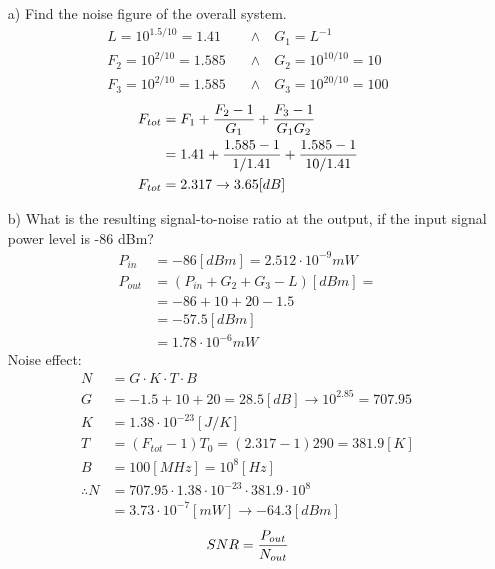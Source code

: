 \documentclass[12pt, letterpaper]{article}
\begin{document}
\begin{itemize}
  \item [a)] Find the noise figure of the overall system.
  \begin{align}
    L
    =
    10^{1.5/10}=1.41
    \quad&\wedge\quad
    G_1
    =
    L^{-1}
    \\
    F_2
    =
    10^{2/10}=1.585
    \quad&\wedge\quad
    G_2
    =
    10^{10/10}
    =
    10
    \\
    F_3
    =
    10^{2/10}=1.585
    \quad&\wedge\quad
    G_3
    =
    10^{20/10}
    =
    100
  \end{align}
  \begin{align}
    F_{tot}
    &=
    F_1
    +
    {F_2-1\over G_1}
    +
    {F_3-1\over G_1G_2}
    \\
    &=
    1.41
    +
    {1.585-1\over 1/1.41}
    +
    {1.585-1\over 10/1.41}
    \\
    F_{tot}
    &=
    2.317
    \rightarrow
    3.65[dB]
  \end{align}
  \item [b)] What is the resulting signal-to-noise ratio at the output, if the input signal power level is -86 dBm?
  \begin{align}
    P_{in}
    &=
    -86[dBm]
    =
    2.512\cdot10^{-9}mW
    \\
    P_{out}
    &=
    (P_{in}+G_2+G_3-L)[dBm]
    =
    \\
    &=
    -86+10+20-1.5
    \\
    &=
    -57.5[dBm]
    \\
    &=
    1.78\cdot10^{-6}mW
  \end{align}
  Noise effect:
  \begin{align}
    N
    &=
    G\cdot K\cdot T\cdot B
    \\
    G
    &=
    -1.5+10+20
    =
    28.5[dB]
    \rightarrow
    10^{2.85}=707.95
    \\
    K&=1.38\cdot10^{-23}[J/K]
    \\
    T
    &=
    (F_{tot}-1)T_0
    =
    (2.317-1)290
    =
    381.9[K]
    \\
    B
    &=
    100[MHz]=10^8[Hz]
    \\
    \therefore
    N
    &=
    707.95\cdot
    1.38\cdot 10^{-23} \cdot
    381.9\cdot
    10^8
    \\
    &=
    3.73\cdot10^{-7}[mW]\rightarrow -64.3[dBm]
  \end{align}
  \begin{align}
    SNR
    =
    {P_{out}\over N_{out}}

\end{align}
\end{itemize}
\end{document}
